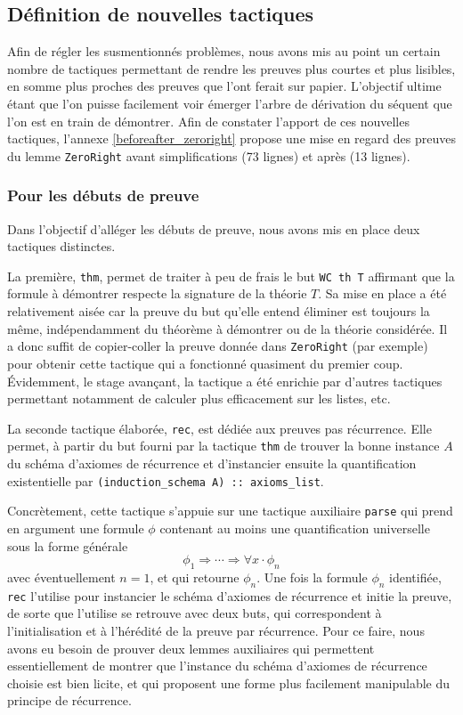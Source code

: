 \documentclass[a4paper]{article}
\begin{document}
\subsection{Définition de nouvelles tactiques}

Afin de régler les susmentionnés problèmes, nous avons mis au point un certain nombre de tactiques permettant de rendre les preuves plus courtes et plus lisibles, en somme plus proches des preuves que l'ont ferait sur papier. L'objectif ultime étant que l'on puisse facilement voir émerger l'arbre de dérivation du séquent que l'on est en train de démontrer. Afin de constater l'apport de ces nouvelles tactiques, l'annexe \ref{beforeafter_zeroright} propose une mise en regard des preuves du lemme \verb+ZeroRight+ avant simplifications (73 lignes) et après (13 lignes).

\subsubsection{Pour les débuts de preuve}

Dans l'objectif d'alléger les débuts de preuve, nous avons mis en place deux tactiques distinctes.
\smallskip

La première, \verb+thm+, permet de traiter à peu de frais le but \verb+WC th T+ affirmant que la formule à démontrer respecte la signature de la théorie $T$. Sa mise en place a été relativement aisée car la preuve du but qu'elle entend éliminer est toujours la même, indépendamment du théorème à démontrer ou de la théorie considérée. Il a donc suffit de copier-coller la preuve donnée dans \verb+ZeroRight+ (par exemple) pour obtenir cette tactique qui a fonctionné quasiment du premier coup. \'Evidemment, le stage avançant, la tactique a été enrichie par d'autres tactiques permettant notamment de calculer plus efficacement sur les listes, etc.
\smallskip

La seconde tactique élaborée, \verb+rec+, est dédiée aux preuves pas récurrence. Elle permet, à partir du but fourni par la tactique \verb+thm+ de trouver la bonne instance $A$ du schéma d'axiomes de récurrence et d'instancier ensuite la quantification existentielle par \verb$(induction_schema A) :: axioms_list$.

Concrètement, cette tactique s'appuie sur une tactique auxiliaire \verb+parse+ qui prend en argument une formule $\phi$ contenant au moins une quantification universelle sous la forme générale \[ \phi_1 \Rightarrow \cdots \Rightarrow \forall x \cdot \phi_n \] avec éventuellement $n = 1$, et qui retourne $\phi_n$. Une fois la formule $\phi_n$ identifiée, \verb+rec+ l'utilise pour instancier le schéma d'axiomes de récurrence et initie la preuve, de sorte que l'utilise se retrouve avec deux buts, qui correspondent à l'initialisation et à l'hérédité de la preuve par récurrence. Pour ce faire, nous avons eu besoin de prouver deux lemmes auxiliaires qui permettent essentiellement de montrer que l'instance du schéma d'axiomes de récurrence choisie est bien licite, et qui proposent une forme plus facilement manipulable du principe de récurrence.
\end{document}
